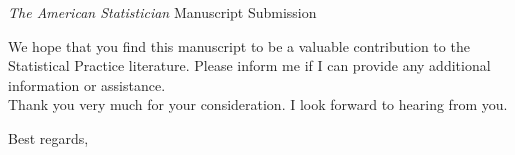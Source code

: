 \documentclass{letter} %
\begin{document}
\begin{letter}{

\textit{The American Statistician} Manuscript Submission}
We hope that you find this manuscript to be a valuable contribution to the  Statistical Practice literature. Please inform me if I can provide any additional information or assistance.  
\\

Thank you very much for your consideration. I look forward to hearing from you.\\

\closing{Best regards,}


~~\\

\end{letter}
\end{document}
